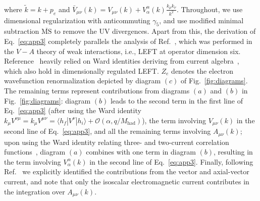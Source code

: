\documentclass[prl,twocolumn,twoside,preprintnumbers,superscriptaddress,nofootinbib,letterpaper]{revtex4-1}
\newcommand{\Order}{\mathcal{O}}
\newcommand{\Mhad}{M_\text{had}}
\begin{document}
where $\tilde k=k+p_e$ and $\bar V_{\mu\nu}(k)=V_{\mu \nu} (k)
+ V^\alpha_\alpha (k)  \frac{k_\mu k_\nu}{k^2}$.
Throughout, we use dimensional regularization with anticommuting $\gamma_5$,
and use modified minimal subtraction   $\overline{\text{MS}}$  to remove the UV divergences.
Apart from this,   the derivation of Eq.~\eqref{eq:app3} completely parallels the analysis of Ref.~\cite{Abers:1968zz},
which was performed in the $V-A$ theory of weak interactions, i.e., LEFT at operator dimension six.
Reference~\cite{Abers:1968zz} heavily relied on Ward identities deriving from current algebra~\cite{Abers:1968zz,Sirlin:1977sv},
which also hold in  dimensionally regulated LEFT.
$Z_e$ denotes the electron wavefunction renormalization depicted by diagram $(c)$ of Fig.~\ref{fig:diagrams}.
The remaining terms represent contributions from diagrams $(a)$ and $(b)$ in Fig.~\ref{fig:diagrams}:
diagram $(b)$ leads to  the second term in the first line of Eq.~\eqref{eq:app3} (after using the
Ward identity $k_\mu V^{\nu \mu} = k_\mu V^{\mu\nu} = \langle h_f | V^\nu | h_i \rangle + \Order (\alpha, q/\Mhad)$),
the term involving $V_{\mu \nu}(k)$  in the second line of  Eq.~\eqref{eq:app3},
and all the remaining terms involving $A_{\mu \nu}(k)$;
upon using the Ward identity relating three- and two-current correlation functions~\cite{Abers:1968zz},
diagram $(a)$ combines with one term in diagram $(b)$, resulting in
the term involving $V^\alpha_\alpha (k)$ in the second line of  Eq.~\eqref{eq:app3}.
Finally,  following  Ref.~\cite{Abers:1968zz}  we explicitly
identified the contributions from  the vector and axial-vector current,
and note that only the isoscalar electromagnetic current contributes in the integration over $A_{\mu \nu} (k)$.
\end{document}
